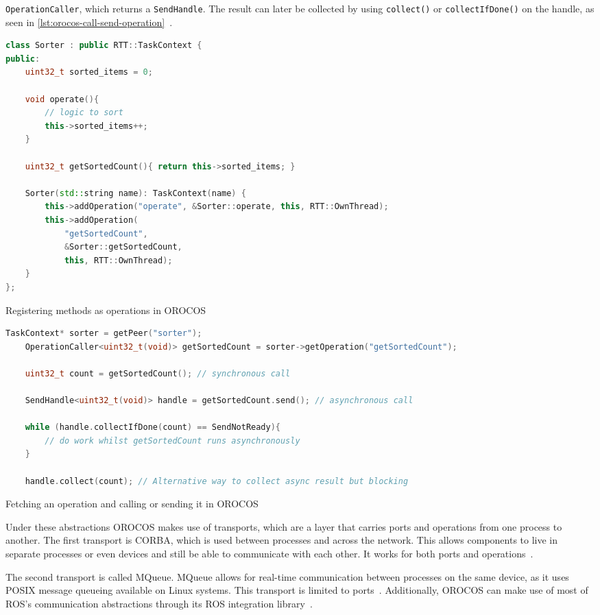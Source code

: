 \documentclass[a4paper]{book}
\begin{document}
\texttt{OperationCaller}, which returns a \texttt{SendHandle}. The result can
later be collected by using \texttt{collect()} or \texttt{collectIfDone()} on
the handle, as seen in
\cref{lst:orocos-call-send-operation}~\cite{orocos_rtt_manual}.
\begin{listing}[ht]
	\begin{lstlisting}[language=C++, morekeywords={[2]TaskContext,OperationCaller,SendHandle,SendStatus,OwnThread,ClientThread}]
class Sorter : public RTT::TaskContext {
public:
    uint32_t sorted_items = 0;

    void operate(){
        // logic to sort
        this->sorted_items++;
    }

    uint32_t getSortedCount(){ return this->sorted_items; }

    Sorter(std::string name): TaskContext(name) {
        this->addOperation("operate", &Sorter::operate, this, RTT::OwnThread);
        this->addOperation(
            "getSortedCount",
            &Sorter::getSortedCount,
            this, RTT::OwnThread);
    }
};
\end{lstlisting}
	\caption{Registering methods as operations in OROCOS}
	\label{lst:orocos-register-operation}
\end{listing}
\par
\begin{listing}[ht]
	\begin{lstlisting}[language=C++, morekeywords={[2]TaskContext,OperationCaller,SendHandle,SendStatus,OwnThread,ClientThread}]
    TaskContext* sorter = getPeer("sorter");
    OperationCaller<uint32_t(void)> getSortedCount = sorter->getOperation("getSortedCount");

    uint32_t count = getSortedCount(); // synchronous call

    SendHandle<uint32_t(void)> handle = getSortedCount.send(); // asynchronous call

    while (handle.collectIfDone(count) == SendNotReady){
        // do work whilst getSortedCount runs asynchronously
    }

    handle.collect(count); // Alternative way to collect async result but blocking
\end{lstlisting}
	\caption{Fetching an operation and calling or sending it in OROCOS}
	\label{lst:orocos-call-send-operation}
\end{listing}
\par
Under these abstractions OROCOS makes use of transports, which are a layer that
carries ports and operations from one process to another. The first transport is
CORBA, which is used between processes and across the network. This allows
components to live in separate processes or even devices and still be able to
communicate with each other. It works for both ports and
operations~\cite{orocos_rtt_manual}.
\par
The second transport is called MQueue. MQueue allows for real-time communication
between processes on the same device, as it uses POSIX message queueing
available on Linux systems. This transport is limited to
ports~\cite{orocos_rtt_manual}.
Additionally, OROCOS can make use of most of ROS's communication abstractions
through its ROS integration library~\cite{orocos_rtt_ros, orocos_rtt_ros2}.
\end{document}
